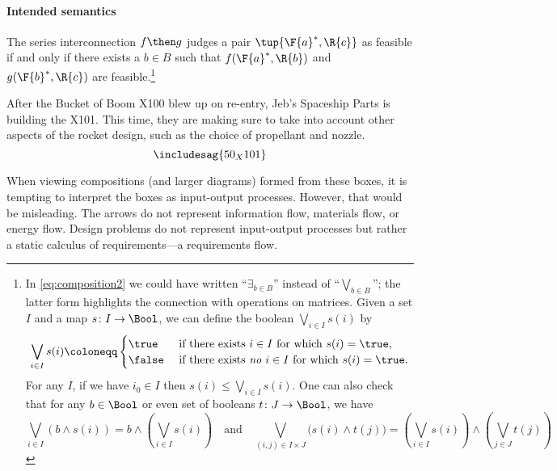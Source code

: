 \paragraph{Intended semantics}
The series interconnection $f\then g$ judges a pair $\tup{\F{a}^*,\R{c}}$ as feasible if and only if there exists a $b \in B$ such that $f(\F{a}^*,\R{b})$ and $g(\F{b}^*,\R{c})$ are feasible.\footnote{In \eqref{eq:composition2} we could have written ``$\exists_{b\in B}$''
instead of ``$\bigvee_{b\in B}$''; the latter form highlights the connection
with operations on matrices. Given a set $I$ and a map $s\colon I\to\Bool$, we can define the boolean $\bigvee_{i\in I}s(i)$ by
\begin{equation*}
 \bigvee_{i\in I}s(i)\coloneqq
 \begin{cases}
 	\true&\text{ if there exists }i\in I\text{ for which }s(i)=\true,\\
 	\false&\text{ if there exists \emph{no} }i\in I\text{ for which }s(i)=\true.
 \end{cases}
 \end{equation*}
 For any $I$, if we have $i_0\in I$ then $s(i)\leq\bigvee_{i\in I}s(i)$. One can also check that for any $b\in\Bool$ or even set of booleans $t\colon J\to\Bool$, we have
 \begin{equation*}
     \bigvee_{i\in I}(b\wedge s(i))=b\wedge\left(\bigvee_{i\in I}s(i)\right)
 \quad\text{and}\quad
 \bigvee_{(i,j)\in I\times  J}\big(s(i)\wedge t(j)\big)=\left(\bigvee_{i\in I}s(i)\right)\wedge\left(\bigvee_{j\in J} t(j)\right)
 \end{equation*}
}

\begin{example}
After the Bucket of Boom X100 blew up on re-entry, Jeb's Spaceship Parts is building the X101. This time, they are making sure to take into account other aspects of the rocket design, such as the choice of propellant and nozzle.
\[
\includesag{50_X101}
\]
\end{example}

\begin{remark}
When viewing compositions (and larger diagrams) formed from these boxes, it is tempting to interpret the boxes as input-output processes. However, that would be misleading. The arrows do not represent information flow, materials flow, or energy flow. Design problems do not represent input-output processes but rather a static calculus of requirements---a requirements flow.
\end{remark}

